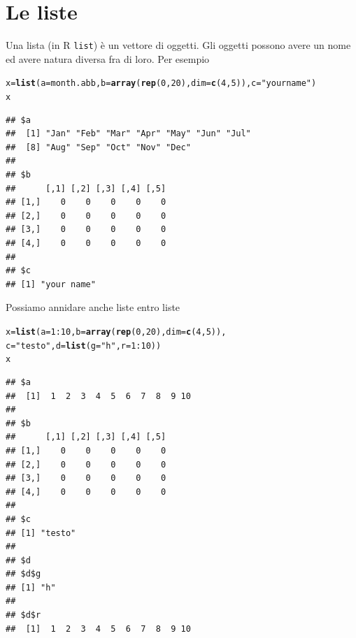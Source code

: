 \documentclass[onecolumn,12pt]{book}\usepackage[]{graphicx}\usepackage[]{color}
\makeatletter
\newcommand{\hlnum}[1]{\textcolor[rgb]{0.686,0.059,0.569}{#1}}%
\newcommand{\hlstr}[1]{\textcolor[rgb]{0.192,0.494,0.8}{#1}}%
\newcommand{\hlopt}[1]{\textcolor[rgb]{0,0,0}{#1}}%
\newcommand{\hlstd}[1]{\textcolor[rgb]{0.345,0.345,0.345}{#1}}%
\newcommand{\hlkwb}[1]{\textcolor[rgb]{0.69,0.353,0.396}{#1}}%
\newcommand{\hlkwc}[1]{\textcolor[rgb]{0.333,0.667,0.333}{#1}}%
\newcommand{\hlkwd}[1]{\textcolor[rgb]{0.737,0.353,0.396}{\textbf{#1}}}%
\newenvironment{kframe}{%
 \def\at@end@of@kframe{}%
 \ifinner\ifhmode%
  \def\at@end@of@kframe{\end{minipage}}%
  \begin{minipage}{\columnwidth}%
 \fi\fi%
 \def\FrameCommand##1{\hskip\@totalleftmargin \hskip-\fboxsep
 \colorbox{shadecolor}{##1}\hskip-\fboxsep
     \hskip-\linewidth \hskip-\@totalleftmargin \hskip\columnwidth}%
 \MakeFramed {\advance\hsize-\width
   \@totalleftmargin\z@ \linewidth\hsize
   \@setminipage}}%
 {\par\unskip\endMakeFramed%
 \at@end@of@kframe}
\newenvironment{knitrout}{}{} %
\makeatother
\begin{document}
\section{Le liste}
Una lista (in \textsf{R} \texttt{list}) \`e un vettore di oggetti.  Gli oggetti possono avere un nome ed avere natura diversa fra di loro. 
Per esempio
\begin{knitrout}
\color{fgcolor}\begin{kframe}
\begin{alltt}
\hlstd{x}\hlkwb{=}\hlkwd{list}\hlstd{(}\hlkwc{a}\hlstd{=month.abb ,} \hlkwc{b}\hlstd{=}\hlkwd{array}\hlstd{(}\hlkwd{rep}\hlstd{(}\hlnum{0}\hlstd{,}\hlnum{20}\hlstd{),} \hlkwc{dim}\hlstd{=}\hlkwd{c}\hlstd{(}\hlnum{4}\hlstd{,}\hlnum{5}\hlstd{)),}\hlkwc{c}\hlstd{=}\hlstr{"your name"}\hlstd{)}
\hlstd{x}
\end{alltt}
\begin{verbatim}
## $a
##  [1] "Jan" "Feb" "Mar" "Apr" "May" "Jun" "Jul"
##  [8] "Aug" "Sep" "Oct" "Nov" "Dec"
## 
## $b
##      [,1] [,2] [,3] [,4] [,5]
## [1,]    0    0    0    0    0
## [2,]    0    0    0    0    0
## [3,]    0    0    0    0    0
## [4,]    0    0    0    0    0
## 
## $c
## [1] "your name"
\end{verbatim}
\end{kframe}
\end{knitrout}
Possiamo annidare anche liste entro liste
\begin{knitrout}
\color{fgcolor}\begin{kframe}
\begin{alltt}
\hlstd{x}\hlkwb{=}\hlkwd{list}\hlstd{(}\hlkwc{a}\hlstd{=}\hlnum{1}\hlopt{:}\hlnum{10}\hlstd{,}\hlkwc{b}\hlstd{=}\hlkwd{array}\hlstd{(}\hlkwd{rep}\hlstd{(}\hlnum{0}\hlstd{,}\hlnum{20}\hlstd{),}\hlkwc{dim}\hlstd{=}\hlkwd{c}\hlstd{(}\hlnum{4}\hlstd{,}\hlnum{5}\hlstd{)),}
\hlkwc{c}\hlstd{=}\hlstr{"testo"}\hlstd{,}\hlkwc{d}\hlstd{=}\hlkwd{list}\hlstd{(}\hlkwc{g}\hlstd{=}\hlstr{"h"}\hlstd{,}\hlkwc{r}\hlstd{=}\hlnum{1}\hlopt{:}\hlnum{10}\hlstd{) )}
\hlstd{x}
\end{alltt}
\begin{verbatim}
## $a
##  [1]  1  2  3  4  5  6  7  8  9 10
## 
## $b
##      [,1] [,2] [,3] [,4] [,5]
## [1,]    0    0    0    0    0
## [2,]    0    0    0    0    0
## [3,]    0    0    0    0    0
## [4,]    0    0    0    0    0
## 
## $c
## [1] "testo"
## 
## $d
## $d$g
## [1] "h"
## 
## $d$r
##  [1]  1  2  3  4  5  6  7  8  9 10
\end{verbatim}
\end{kframe}
\end{knitrout}
\end{document}
